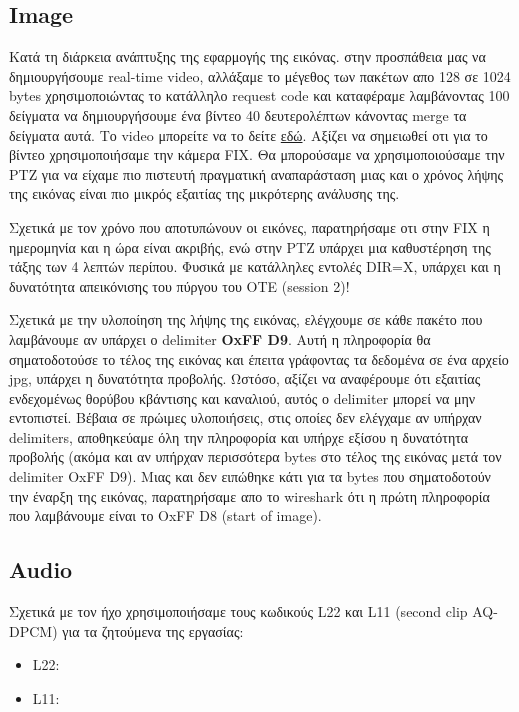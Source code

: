 \documentclass[hidelinks, 12pt, a4paper]{article}
\begin{document}
\subsection{Image}

Κατά τη διάρκεια ανάπτυξης της εφαρμογής της εικόνας. στην προσπάθεια μας να δημιουργήσουμε real-time video, αλλάξαμε το μέγεθος των πακέτων απο 128 σε 1024 bytes χρησιμοποιώντας το κατάλληλο request code και καταφέραμε λαμβάνοντας 100 δείγματα να δημιουργήσουμε ένα βίντεο 40 δευτερολέπτων κάνοντας merge τα δείγματα αυτά. Το video μπορείτε να το δείτε \href{https://drive.google.com/file/d/1yfwckvGBr8YteigF3ainMJMXwLOzjZ9u/view?usp=sharing}{εδώ}. Αξίζει να σημειωθεί οτι για το βίντεο χρησιμοποιήσαμε την κάμερα FIX. Θα μπορούσαμε να χρησιμοποιούσαμε την PTZ για να είχαμε πιο πιστευτή πραγματική αναπαράσταση μιας και ο χρόνος λήψης της εικόνας είναι πιο μικρός εξαιτίας της μικρότερης ανάλυσης της.

Σχετικά με τον χρόνο που αποτυπώνουν οι εικόνες, παρατηρήσαμε οτι στην FIX η ημερομηνία και η ώρα είναι ακριβής, ενώ στην PTZ υπάρχει μια καθυστέρηση της τάξης των 4 λεπτών περίπου. Φυσικά με κατάλληλες εντολές DIR=X, υπάρχει και η δυνατότητα απεικόνισης του πύργου του ΟΤΕ (session 2)!

Σχετικά με την υλοποίηση  της λήψης της εικόνας, ελέγχουμε σε κάθε πακέτο που λαμβάνουμε αν υπάρχει ο delimiter \textbf{OxFF D9}. Αυτή η πληροφορία θα σηματοδοτούσε το τέλος της εικόνας και έπειτα γράφοντας τα δεδομένα σε ένα αρχείο jpg, υπάρχει η δυνατότητα προβολής. Ωστόσο, αξίζει να αναφέρουμε ότι εξαιτίας ενδεχομένως θορύβου κβάντισης και καναλιού, αυτός ο delimiter μπορεί να μην εντοπιστεί. Βέβαια σε πρώιμες υλοποιήσεις, στις οποίες δεν ελέγχαμε αν υπήρχαν delimiters, αποθηκεύαμε όλη την πληροφορία και υπήρχε εξίσου η δυνατότητα προβολής (ακόμα και αν υπήρχαν περισσότερα bytes στο τέλος της εικόνας μετά τον delimiter OxFF D9). Μιας και δεν ειπώθηκε κάτι για τα bytes που σηματοδοτούν την έναρξη της εικόνας, παρατηρήσαμε απο το wireshark ότι η πρώτη πληροφορία που λαμβάνουμε είναι το OxFF D8 (start of image).

\subsection{Audio}

Σχετικά με τον ήχο χρησιμοποιήσαμε τους κωδικούς L22 και L11 (second clip AQ-DPCM) για τα ζητούμενα της εργασίας: 
\begin{itemize}
    \item L22:
    \item L11: 
\end{itemize}
\end{document}
